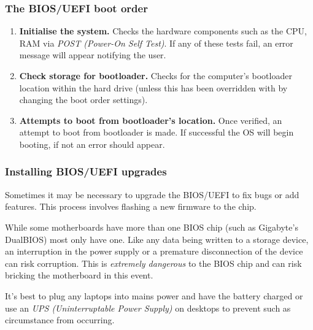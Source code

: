 \documentclass{article}
\begin{document}
\subsubsection{The BIOS/UEFI boot order}

\begin{enumerate}
\item \textbf{Initialise the system.} Checks the hardware components such as the CPU, RAM via \textit{POST (Power-On Self Test)}. If any of these tests fail, an error message will appear notifying the user.

\item \textbf{Check storage for bootloader.} Checks for the computer's bootloader location within the hard drive (unless this has been overridden with by changing the boot order settings).

\item \textbf {Attempts to boot from bootloader's location.} Once verified, an attempt to boot from bootloader is made. If successful the OS will begin booting, if not an error should appear.
\end{enumerate}

\subsubsection{Installing BIOS/UEFI upgrades}

Sometimes it may be necessary to upgrade the BIOS/UEFI to fix bugs or add features. This process involves flashing a new firmware to the chip.

While some motherboards have more than one BIOS chip (such as Gigabyte's DualBIOS) most only have one. Like any data being written to a storage device, an interruption in the power supply or a premature disconnection of the device can risk corruption. This is \textit{extremely dangerous} to the BIOS chip and can risk bricking the motherboard in this event.

It's best to plug any laptops into mains power and have the battery charged or use an \textit{UPS (Uninterruptable Power Supply)} on desktops to prevent such as circumstance from occurring.
\end{document}
